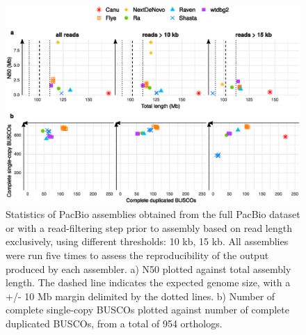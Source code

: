 \begin{suppsection}
   \begin{figure}[ht]
    \centering
     \includegraphics[width=13.5cm]{fig/benchmark/supp_pacbio_replicates.eps}
   \caption{Statistics of PacBio assemblies obtained from the full PacBio dataset or with a read-filtering step prior to assembly based on read length exclusively, using different thresholds: 10 kb, 15 kb. All assemblies were run five times to assess the reproducibility of the output produced by each assembler. a) N50 plotted against total assembly length. The dashed line indicates the expected genome size, with a +/- 10 Mb margin delimited by the dotted lines. b) Number of complete single-copy BUSCOs plotted against number of complete duplicated BUSCOs, from a total of 954 orthologs.}
   \label{fig:pacbio_replicates}
 \end{figure}
 

\end{suppsection}
